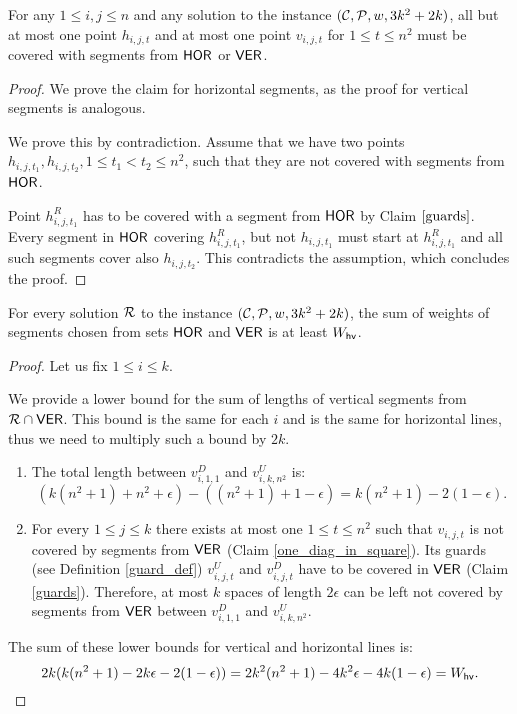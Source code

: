 \begin{claim}
\label{one_diag_in_square}
For any $1 \le i, j \le n$
and any solution to the instance $(\mathcal{C}, \mathcal{P}, w, 3k^2+2k)$,
all but at most one point $h_{i, j, t}$
and at most one point $v_{i, j, t}$
for $1 \le t \le n^2$
must be
covered with segments from $\mathsf{HOR}$ or $\mathsf{VER}$.
\end{claim}

\begin{proof}
We prove the claim for horizontal segments,
as the proof for vertical segments is analogous.

We prove this by contradiction. Assume that we
have two points $h_{i,j,t_1}, h_{i,j,t_2},1 \le t_1 <  t_2 \le n^2$,
such that they are not covered with segments from $\mathsf{HOR}$.

Point $h^R_{i, j, t_1}$ has to be covered with a segment from $\mathsf{HOR}$
by Claim $\ref{guards}$.
Every segment in $\mathsf{HOR}$ covering $h^R_{i, j, t_1}$,
but not $h_{i,j,t_1}$ must start at $h^R_{i, j, t_1}$
and all such segments cover also $h_{i, j, t_2}$.
This contradicts the assumption, which concludes the proof.
\end{proof}

\begin{lemma}
\label{vertical_horizontal_sum}
For every solution $\mathcal{R}$ to the instance $(\mathcal{C}, \mathcal{P}, w, 3k^2+2k)$,
the sum of weights of segments chosen
from sets $\mathsf{HOR}$ and $\mathsf{VER}$ is at least
$W_{\mathsf{hv}}$.
\end{lemma}

\begin{proof}
Let us fix $1 \le i \le k$.

We provide a lower bound for the sum of lengths
of vertical segments from $\mathcal{R} \cap \mathsf{VER}$.
This bound is the same for each $i$ and is the same
for horizontal lines, thus we need to multiply such a bound by $2k$.

\begin{enumerate}[label={(\arabic*)}]
\item The total length between $v^D_{i, 1, 1}$ and $v^U_{i, k, n^2}$ is:
$$(k(n^2+1) + n^2 +\epsilon) - ((n^2+1)+1 -\epsilon) = k(n^2+1) - 2(1 - \epsilon).$$

\item For every $1 \le j \le k$ there exists at most one $1 \le t \le n^2$
such that $v_{i,j,t}$ is not covered by segments from $\mathsf{VER}$
(Claim \ref{one_diag_in_square}).
Its guards (see Definition \ref{guard_def}) $v^U_{i,j,t}$ and $v^D_{i,j,t}$
have to be covered in $\mathsf{VER}$ (Claim \ref{guards}).
Therefore, at most $k$ spaces of length $2\epsilon$ can be left
not covered by segments from $\mathsf{VER}$ between $v_{i,1,1}^D$ and $v_{i,k,n^2}^U$.

\end{enumerate}
The sum of these lower bounds for vertical and horizontal lines is:
$$2k(k(n^2+1) -2k\epsilon -2(1-\epsilon)) = 2k^2(n^2+1) -4k^2\epsilon -4k(1-\epsilon) = W_{\mathsf{hv}}.\qedhere$$
\end{proof}

